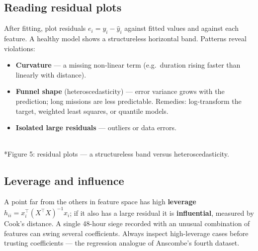 \documentclass[11pt]{article}
\begin{document}
\subsection{Reading residual plots}
After fitting, plot residuals $e_i=y_i-\hat y_i$ against fitted values and against each feature. A healthy model shows a structureless horizontal band. Patterns reveal violations:
\begin{itemize}
\item \textbf{Curvature} --- a missing non-linear term (e.g.\ duration rising faster than linearly with distance).
\item \textbf{Funnel shape} (heteroscedasticity) --- error variance grows with the prediction; long missions are less predictable. Remedies: log-transform the target, weighted least squares, or quantile models.
\item \textbf{Isolated large residuals} --- outliers or data errors.
\end{itemize}
\begin{center}\\*{\small\color{GreyN}Figure 5: residual plots --- a structureless band versus heteroscedasticity.}\end{center}

\subsection{Leverage and influence}
A point far from the others in feature space has high \textbf{leverage} $h_{ii}=x_i^\top(X^\top X)^{-1}x_i$; if it also has a large residual it is \textbf{influential}, measured by Cook's distance. A single 48-hour siege recorded with an unusual combination of features can swing several coefficients. Always inspect high-leverage cases before trusting coefficients --- the regression analogue of Anscombe's fourth dataset.
\end{document}
